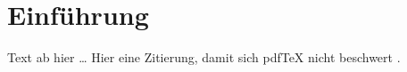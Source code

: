 \section{Einführung}

Text ab hier \ldots
Hier eine Zitierung, damit sich pdfTeX nicht beschwert \cite{Papula2006}.